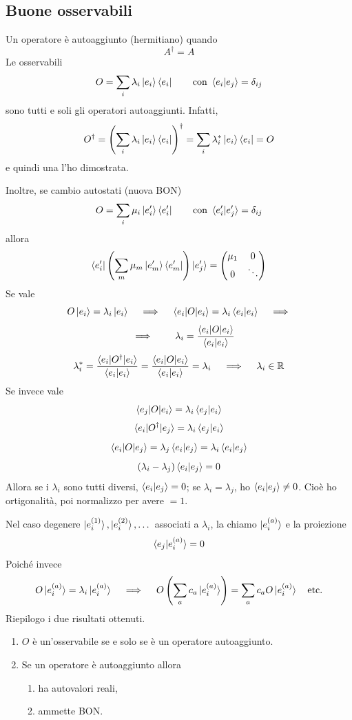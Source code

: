 \subsection{Buone osservabili}
Un operatore è autoaggiunto (hermitiano) quando
\[
  A^\dag = A
\]
Le osservabili
\[
  O = \sum_i \lambda_i \ket{e_i}\bra{e_i}
  \qquad
  \text{con } \braket{e_i|e_j} = \delta_{ij}
\]
sono tutti e soli gli operatori autoaggiunti. Infatti,
\[
  O^\dag
  = \left( \sum_i \lambda_i \ket{e_i} \bra{e_i} \right)^\dag
  = \sum_i \lambda_i^* \ket{e_i} \bra{e_i}
  = O
\]
e quindi una l'ho dimostrata.

\bigskip
\noindent
Inoltre, se cambio autostati (nuova BON)
\[
  O = \sum_i \mu_i \ket{e_i'} \bra{e_i'}
  \qquad
  \text{con } \braket{e_i'|e_j'} = \delta_{ij}
\]
allora
\[
  \braket{e_i'|\left( \sum_m \mu_m \ket{e_m'} \bra{e_m'} \right)|e_j'}
  = \begin{pmatrix}
    \mu_1 & 0 \\
    0     & \ddots
  \end{pmatrix}
\]
Se vale
\[
  O \ket{e_i} = \lambda_i \ket{e_i}
  \quad \implies \quad
  \braket{e_i|O|e_i} = \lambda_i \braket{e_i|e_i}
  \quad \implies
\]
\[
  \quad \implies \qquad
  \lambda_i = \frac{\braket{e_i|O|e_i}}{\braket{e_i|e_i}}
\]
\[
  \lambda_i^*
  = \frac{\braket{e_i|O^\dag|e_i}}{\braket{e_i|e_i}}
  = \frac{\braket{e_i|O|e_i}}{\braket{e_i|e_i}}
  = \lambda_i \quad \implies \quad \lambda_i \in \mathbb{R}
\]
Se invece vale
\[
  \braket{e_j|O|e_i} = \lambda_i \braket{e_j|e_i}
\]
\[
  \braket{e_i|O^\dag|e_j} = \lambda_i \braket{e_j|e_i}
\]
\[
  \braket{e_i|O|e_j} = \lambda_j \braket{e_i|e_j} = \lambda_i \braket{e_i|e_j}
\]
\[
  \left( \lambda_i - \lambda_j \right) \braket{e_i|e_j} = 0
\]
Allora se i \(\lambda_i\) sono tutti diversi, \(\braket{e_i|e_j} = 0\); se
\(\lambda_i = \lambda_j\), ho \(\braket{e_i|e_j} \neq 0\). Cioè ho
ortigonalità, poi normalizzo per avere \(= 1\).

\bigskip
\noindent
Nel caso degenere \(\ket{e_i^{(1)}}, \ket{e_i^{(2)}}, \dots\) associati a
\(\lambda_i\), la chiamo \(\ket{e_i^{(a)}}\) e la proiezione
\[
  \braket{e_j|e_i^{(a)}} = 0
\]
Poiché invece
\[
  O \ket{e_i^{(a)}} = \lambda_i \ket{e_i^{(a)}}
  \quad \implies \quad
  O \left( \sum_a c_a \ket{e_i^{(a)}} \right)
  = \sum_a c_a O \ket{e_i^{(a)}} \quad \text{etc.}
\]
Riepilogo i due risultati ottenuti.
\begin{enumerate}
  \item \(O\) è un'osservabile se e solo se è un operatore autoaggiunto.
  \item Se un operatore è autoaggiunto allora
  \begin{enumerate}
    \item ha autovalori reali,
    \item ammette BON.
  \end{enumerate}
\end{enumerate}
